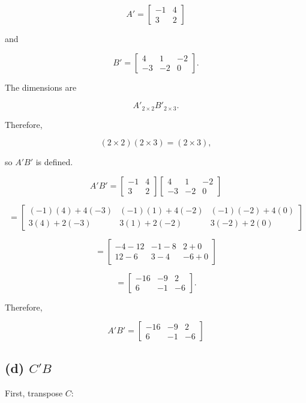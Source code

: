 \documentclass[12pt]{article}
\begin{document}
	\[
	A'
	=
	\begin{bmatrix}
		-1 & 4\\
		3 & 2
	\end{bmatrix}
	\]
	
	and
	
	\[
	B'
	=
	\begin{bmatrix}
		4 & 1 & -2\\
		-3 & -2 & 0
	\end{bmatrix}.
	\]
	
	The dimensions are
	
	\[
	A'_{2\times2}B'_{2\times3}.
	\]
	
	Therefore,
	
	\[
	(2\times2)(2\times3)=(2\times3),
	\]
	
	so $A'B'$ is defined.
	
	\[
	A'B'
	=
	\begin{bmatrix}
		-1 & 4\\
		3 & 2
	\end{bmatrix}
	\begin{bmatrix}
		4 & 1 & -2\\
		-3 & -2 & 0
	\end{bmatrix}
	\]
	
	\[
	=
	\begin{bmatrix}
		(-1)(4)+4(-3) &
		(-1)(1)+4(-2) &
		(-1)(-2)+4(0)
		\\
		3(4)+2(-3) &
		3(1)+2(-2) &
		3(-2)+2(0)
	\end{bmatrix}
	\]
	
	\[
	=
	\begin{bmatrix}
		-4-12 & -1-8 & 2+0\\
		12-6 & 3-4 & -6+0
	\end{bmatrix}
	\]
	
	\[
	=
	\begin{bmatrix}
		-16 & -9 & 2\\
		6 & -1 & -6
	\end{bmatrix}.
	\]
	
	Therefore,
	
	\[
	\boxed{
		A'B' =
		\begin{bmatrix}
			-16 & -9 & 2\\
			6 & -1 & -6
	\end{bmatrix}}
	\]
	
	\subsection*{(d) $C'B$}
	
	First, transpose $C$:
	
\end{document}
